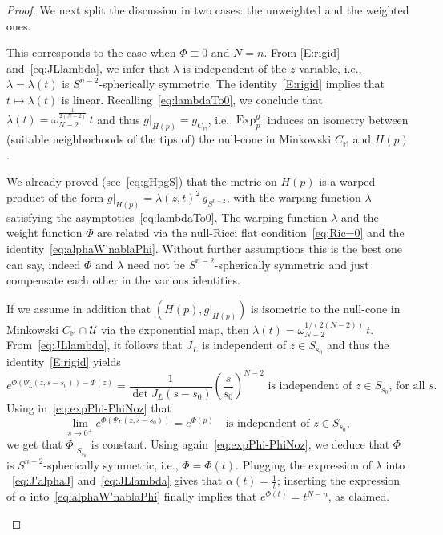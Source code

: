 \documentclass[12pt,a4paper]{amsart}
\theoremstyle{plain}
\theoremstyle{definition}
\numberwithin{equation}{section}
\DeclareMathOperator{\Exp}{Exp}
\begin{document}
\begin{proof}
We next split the discussion  in two cases: the unweighted and the weighted ones.

\begin{description}[leftmargin=1cm,itemsep=.4cm]

\item[The unweighted case]

  This corresponds to the case when $\Phi\equiv 0$ and $N=n$.  From
\eqref{E:rigid} and~\eqref{eq:JLlambda}, we infer that $\lambda$ is
independent of the $z$ variable, i.e., $\lambda=\lambda(t)$ is
$S^{n-2}$-spherically symmetric. 
 The identity~\eqref{E:rigid} implies that $t\mapsto \lambda(t)$ is linear. 
Recalling~\eqref{eq:lambdaTo0}, we conclude that $\lambda(t)=  \omega_{N-2}^{\frac{1}{2(N-2)}}\, t$ and thus $g|_{H(p)}= g_{C_{\mathbb{M}}}$, i.e. $\Exp^g_p$ induces an isometry between (suitable neighborhoods of the tips of)  the null-cone in Minkowski $C_{\mathbb{M}}$ and $H(p)$.


\item[The weighted case]

  We already proved (see~\eqref{eq:gHpgS}) that the metric on $H(p)$ is a warped product of the form $
g|_{H(p)}= \lambda(z,t)^2 \, g_{S^{n-2}}$, with the warping function $\lambda$ satisfying the asymptotics~\eqref{eq:lambdaTo0}. The warping function $\lambda$ and the weight function $\Phi$ are related via the null-Ricci flat condition~\eqref{eq:Ric=0} and the identity~\eqref{eq:alphaW'nablaPhi}. Without further assumptions this is the best one can say, indeed $\Phi$ and $\lambda$ need not be $S^{n-2}$-spherically symmetric and just compensate each other in the various identities.

If we assume in addition that $(H(p), g|_{H(p)})$ is isometric to the null-cone in Minkowski $C_{\mathbb{M}}\cap \mathcal{U}$ via the exponential map, then $\lambda(t)=  \omega_{N-2}^{1/(2(N-2))}\, t$. From~\eqref{eq:JLlambda}, it follows that $J_L$ is independent of $z\in S_{s_0}$ and thus the identity~\eqref{E:rigid} yields
\begin{equation}\label{eq:expPhi-PhiNoz}
e^{\Phi(\Psi_L(z,s- s_0))- \Phi(z)}  = \frac{1}{\det J_L(s-s_0)}
\left(\frac{s}{s_0}\right)^{N-2}  \text{ is independent of $z\in S_{s_0}$, for all $s$}.
\end{equation}
Using in~\eqref{eq:expPhi-PhiNoz} that
$$\lim_{s\to 0^+} e^{\Phi(\Psi_L(z,s- s_0))}=e^{\Phi(p)} \quad\text{is independent of $z\in S_{s_0}$},
$$
we get that $\Phi|_{S_{s_0}}$ is constant. Using again~\eqref{eq:expPhi-PhiNoz}, 
 we deduce that $\Phi$ is $S^{n-2}$-spherically symmetric, i.e., $\Phi=\Phi(t)$. Plugging the expression of $\lambda$ into ~\eqref{eq:J'alphaJ} and~\eqref{eq:JLlambda} gives that $\alpha(t)=\frac{1}{t}$;  inserting the expression of $\alpha$ into~\eqref{eq:alphaW'nablaPhi} finally implies that $e^{\Phi(t)}=t^{N-n}$, as claimed.
\qedhere
\end{description}

\end{proof}
\end{document}
